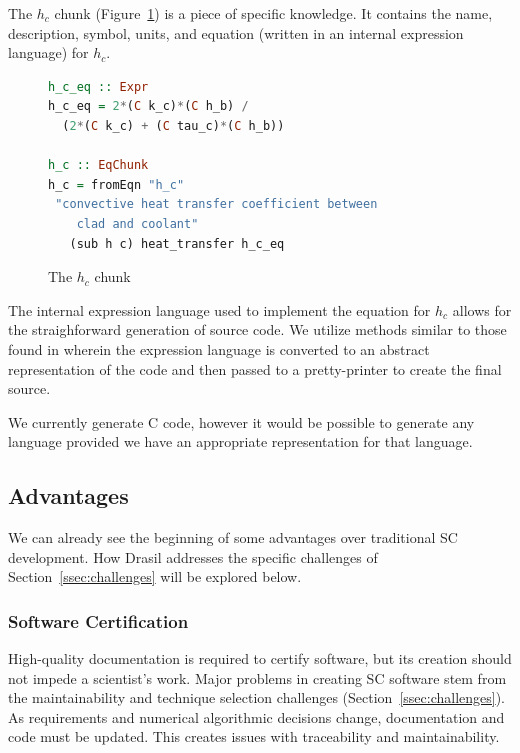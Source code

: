 \documentclass{sig-alternate-05-2015}
\newcommand{\lss}{Drasil}
\begin{document}
The $h_c$ chunk (Figure~\ref{fig:know_specific}) is a piece of specific
knowledge. It contains the name, description, symbol, units, and equation
(written in an internal expression language) for $h_c$.

\begin{figure}
\begin{lstlisting}[language=Haskell, frame=single, showstringspaces=false, basicstyle=\small]
h_c_eq :: Expr
h_c_eq = 2*(C k_c)*(C h_b) /
  (2*(C k_c) + (C tau_c)*(C h_b))

h_c :: EqChunk
h_c = fromEqn "h_c" 
 "convective heat transfer coefficient between 
    clad and coolant"
   (sub h c) heat_transfer h_c_eq
\end{lstlisting}
\caption{The $h_c$ chunk}
\label{fig:know_specific}
\end{figure}

The internal expression language used to implement the equation for $h_c$
allows for the straighforward generation of source code. We utilize methods
similar to those found in \cite{SAGA:DSL, Szymczak2014}
wherein the expression language is converted to an abstract representation of
the code and then passed to a pretty-printer to create the final source.

We currently generate C code, however it would be possible to generate any
language provided we have an appropriate representation for that language.

\subsection{Advantages} \label{ssec:advantages}

We can already see the beginning of some advantages over traditional SC
development. How \lss{} addresses the specific challenges of
Section~\ref{ssec:challenges} will be explored below.

\subsubsection{Software Certification} \label{sssec:adv_cert}

High-quality documentation is required to certify software, but its creation
should not impede a scientist's work.  Major problems in creating SC software
stem from the maintainability and technique selection challenges
(Section~\ref{ssec:challenges}). As requirements and numerical algorithmic
decisions change, documentation and code must be updated.  This creates issues
with traceability and maintainability.
\end{document}
